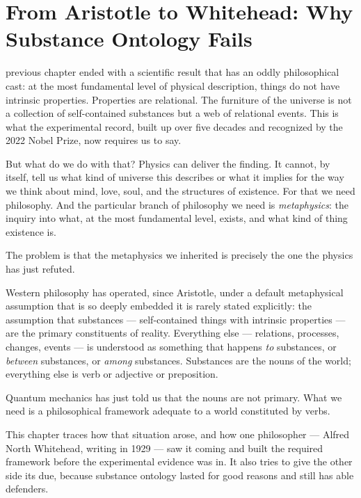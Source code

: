 \chapter[From Aristotle to Whitehead]{From Aristotle to Whitehead: Why Substance Ontology Fails}
\label{ch:aristotle-whitehead}


 previous chapter ended with a scientific result that has an oddly philosophical cast: at the most fundamental level of physical description, things do not have intrinsic properties. Properties are relational. The furniture of the universe is not a collection of self-contained substances but a web of relational events. This is what the experimental record, built up over five decades and recognized by the 2022 Nobel Prize, now requires us to say.

But what do we do with that? Physics can deliver the finding. It cannot, by itself, tell us what kind of universe this describes or what it implies for the way we think about mind, love, soul, and the structures of existence. For that we need philosophy. And the particular branch of philosophy we need is \emph{metaphysics}: the inquiry into what, at the most fundamental level, exists, and what kind of thing existence is.

The problem is that the metaphysics we inherited is precisely the one the physics has just refuted.

Western philosophy has operated, since Aristotle, under a default metaphysical assumption that is so deeply embedded it is rarely stated explicitly: the assumption that substances --- self-contained things with intrinsic properties --- are the primary constituents of reality. Everything else --- relations, processes, changes, events --- is understood as something that happens \emph{to} substances, or \emph{between} substances, or \emph{among} substances. Substances are the nouns of the world; everything else is verb or adjective or preposition.

Quantum mechanics has just told us that the nouns are not primary. What we need is a philosophical framework adequate to a world constituted by verbs.

This chapter traces how that situation arose, and how one philosopher --- Alfred North Whitehead, writing in 1929 --- saw it coming and built the required framework before the experimental evidence was in. It also tries to give the other side its due, because substance ontology lasted for good reasons and still has able defenders.

